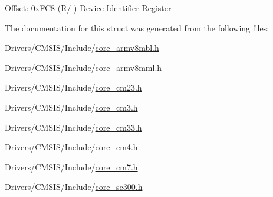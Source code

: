 Offset\+: 0x\+F\+C8 (R/ ) Device Identifier Register 

The documentation for this struct was generated from the following files\+:\begin{DoxyCompactItemize}
\item 
Drivers/\+C\+M\+S\+I\+S/\+Include/\hyperlink{core__armv8mbl_8h}{core\+\_\+armv8mbl.\+h}\item 
Drivers/\+C\+M\+S\+I\+S/\+Include/\hyperlink{core__armv8mml_8h}{core\+\_\+armv8mml.\+h}\item 
Drivers/\+C\+M\+S\+I\+S/\+Include/\hyperlink{core__cm23_8h}{core\+\_\+cm23.\+h}\item 
Drivers/\+C\+M\+S\+I\+S/\+Include/\hyperlink{core__cm3_8h}{core\+\_\+cm3.\+h}\item 
Drivers/\+C\+M\+S\+I\+S/\+Include/\hyperlink{core__cm33_8h}{core\+\_\+cm33.\+h}\item 
Drivers/\+C\+M\+S\+I\+S/\+Include/\hyperlink{core__cm4_8h}{core\+\_\+cm4.\+h}\item 
Drivers/\+C\+M\+S\+I\+S/\+Include/\hyperlink{core__cm7_8h}{core\+\_\+cm7.\+h}\item 
Drivers/\+C\+M\+S\+I\+S/\+Include/\hyperlink{core__sc300_8h}{core\+\_\+sc300.\+h}\end{DoxyCompactItemize}
